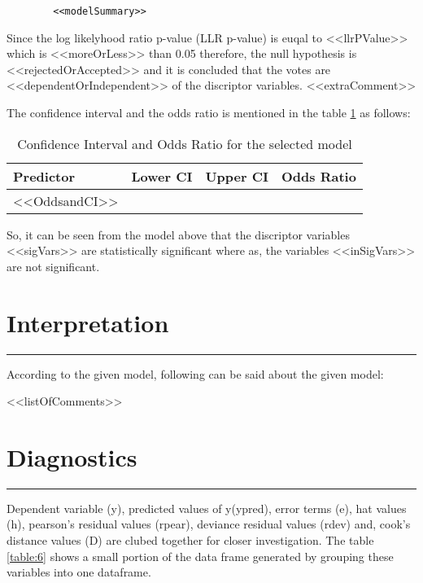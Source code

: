\documentclass[a4paper,12pt, notitlepage]{article}
\begin{document}
\begin{mdframed}[hidealllines=true,backgroundcolor=gray!20]
	\begin{verbatim}
		<<modelSummary>>
	\end{verbatim}
\end{mdframed}

\par
Since the log likelyhood ratio p-value (LLR p-value) is euqal to <<llrPValue>> which is <<moreOrLess>> than 0.05 therefore, the null hypothesis is <<rejectedOrAccepted>> and it is concluded that the votes are <<dependentOrIndependent>> of the discriptor variables. <<extraComment>>
\par
The confidence interval and the odds ratio is mentioned in the table \ref{table:5} as follows:

\begin{table}[!htbp]
\centering
\begin{tabular}{ |l|r|r|r| }
\hline \rowcolor{Gray}
Predictor & Lower CI & Upper CI & Odds Ratio   \\
\hline
<<OddsandCI>>
\hline
\end{tabular}
\caption{Confidence Interval and Odds Ratio for the selected model}
\label{table:5}
\end{table}

So, it can be seen from the model above that the discriptor variables <<sigVars>> are statistically significant where as, the variables <<inSigVars>> are not significant.

\section{Interpretation}
\rule{\textwidth}{0.5pt}
\par
According to the given model, following can be said about the given model:

\begin{itemize}
<<listOfComments>>
\end{itemize}

\section{Diagnostics}
\rule{\textwidth}{0.5pt}
\par
Dependent variable (y), predicted values of y(ypred), error terms (e), hat values (h), pearson's residual values (rpear), deviance residual values (rdev) and, cook's distance values (D) are clubed together for closer investigation. The table \ref{table:6} shows a small portion of the data frame generated by grouping these variables into one dataframe.
\end{document}

